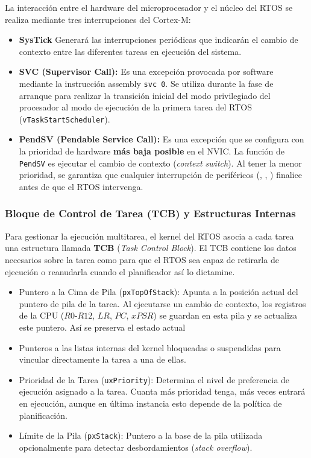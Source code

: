 \documentclass[../main.tex]{subfiles}
\begin{document}
            La interacción entre el hardware del microprocesador y el núcleo del RTOS se realiza mediante tres interrupciones del Cortex-M:

            \begin{itemize}
                \item \textbf{SysTick} Generará las interrupciones periódicas que indicarán el cambio de contexto entre las diferentes tareas en ejecución del sistema.
                \item \textbf{SVC (Supervisor Call):} Es una excepción provocada por software mediante la instrucción assembly \texttt{svc 0}. Se utiliza durante la fase de arranque para realizar la transición inicial del modo privilegiado del procesador al modo de ejecución de la primera tarea del RTOS (\texttt{vTaskStartScheduler}).
                \item \textbf{PendSV (Pendable Service Call):} Es una excepción que se configura con la prioridad de hardware \textbf{más baja posible} en el NVIC. La función de \texttt{PendSV} es ejecutar el cambio de contexto (\textit{context switch}). Al tener la menor prioridad, se garantiza que cualquier interrupción de periféricos (, , ) finalice antes de que el RTOS intervenga.
            \end{itemize}

        \subsubsection{Bloque de Control de Tarea (TCB) y Estructuras Internas}

            Para gestionar la ejecución multitarea, el kernel del RTOS asocia a cada tarea una estructura llamada \textbf{TCB} (\textit{Task Control Block}). El TCB contiene los datos necesarios sobre la tarea como para que el RTOS sea capaz de retirarla de ejecución o reanudarla cuando el planificador así lo dictamine.

            \begin{itemize}
                \item Puntero a la Cima de Pila (\texttt{pxTopOfStack}): Apunta a la posición actual del puntero de pila de la tarea. Al ejecutarse un cambio de contexto, los registros de la CPU ($R0$-$R12$, $LR$, $PC$, $xPSR$) se guardan en esta pila y se actualiza este puntero. Así se preserva el estado actual
                \item Punteros a las listas internas del kernel bloqueadas o suspendidas para vincular directamente la tarea a una de ellas.
                \item Prioridad de la Tarea (\texttt{uxPriority}): Determina el nivel de preferencia de ejecución asignado a la tarea. Cuanta más prioridad tenga, más veces entrará en ejecución, aunque en última instancia esto depende de la política de planificación.
                \item Límite de la Pila (\texttt{pxStack}): Puntero a la base de la pila utilizada opcionalmente para detectar desbordamientos (\textit{stack overflow}).
            \end{itemize}
\end{document}
